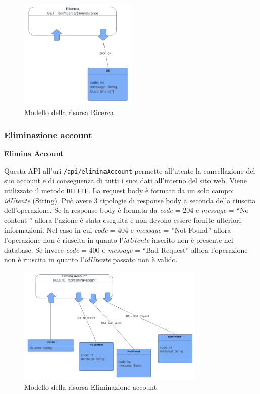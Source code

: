 \documentclass[a4paper,12pt]{article}
\begin{document}
\begin{figure}[htp]
    \centering
    \includegraphics[width=0.5\textwidth]{resource-models/ricerca.png}
    \caption{Modello della risorsa Ricerca}
\end{figure}

\subsubsection*{Eliminazione account}

\textbf{Elimina Account}

Questa API all’uri \texttt{/api/eliminaAccount} permette all’utente la cancellazione del suo account e di conseguenza di tutti i suoi dati all’interno del sito web. Viene utilizzato il metodo \texttt{DELETE}. \newline
La request body è formata da un solo campo: \textit{idUtente} (String).
Può avere 3 tipologie di response body a seconda della riuscita dell’operazione. \newline
Se la response body è formata da \textit{code} = 204 e \textit{message} = “No content ” allora l'azione è stata eseguita e non devono essere fornite ulteriori informazioni. \newline
Nel caso in cui \textit{code} = 404  e \textit{message} = ”Not Found” allora l’operazione non è riuscita in quanto l’\textit{idUtente} inserito non è presente nel database. \newline
Se invece \textit{code} = 400 e \textit{message} = “Bad Request” allora l’operazione non è riuscita in quanto l’\textit{idUtente} passato non è valido.

\begin{figure}[htp]
    \centering
    \includegraphics[width=0.8\textwidth]{resource-models/elimina-account.png}
    \caption{Modello della risorsa Eliminazione account}
\end{figure}
\end{document}
